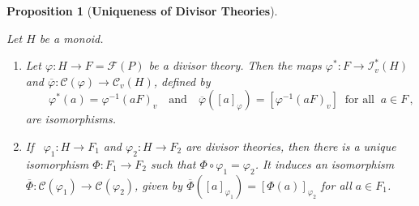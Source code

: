 \documentclass[a4paper]{amsart}
\newtheorem{proposition}[theorem]{Proposition}
\theoremstyle{definition}
\numberwithin{equation}{section}
\begin{document}
\medskip
\begin{proposition}[\bf Uniqueness of Divisor Theories]
\label{4.15}~

Let $H$ be a monoid.
\begin{enumerate}
\item Let $\varphi \colon H \to F = \mathcal  F (P)$ be a divisor theory.
      Then the maps $\varphi^* \colon F \to \mathcal I_v^* (H)$ and
      $\overline \varphi \colon \mathcal C (\varphi)  \to \mathcal C_v (H)$, defined
      by
      \[
      \qquad \varphi^*(a) = \varphi^{-1} (aF)_v \quad \text{and} \quad
      \overline\varphi([a]_\varphi) = [\varphi^{-1} (aF)_v]  \ \text{ for
      all } \ a \in F \,,
      \]
      are isomorphisms.

\smallskip
\item If \ $\varphi_1 \colon H \to F_1$ and $\varphi_2 \colon H \to
F_2$ are divisor theories, then there is a unique isomorphism $\Phi
\colon F_1 \to F_2$ such that $\Phi \circ \varphi_1 = \varphi_2$. It
induces an isomorphism $\overline \Phi \colon \mathcal C(\varphi_1)
\to \mathcal C(\varphi_2)$, given by $\overline \Phi
([a]_{\varphi_1}) = [\Phi(a)]_{\varphi_2}$ for all $a \in F_1$.
\end{enumerate}
\end{proposition}
\end{document}
